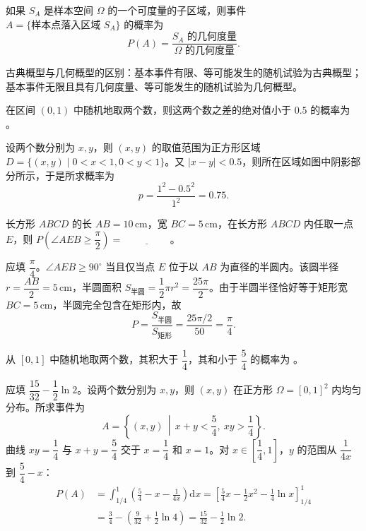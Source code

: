 \documentclass[lang=cn,11pt]{elegantbook}
\begin{document}
如果 \(S_A\) 是样本空间 \(\Omega\) 的一个可度量的子区域，则事件 \(A = \{\text{样本点落入区域 } S_A\}\) 的概率为
\[
P(A) = \frac{S_A \text{ 的几何度量}}{\Omega \text{ 的几何度量}}.
\]

\begin{note}
古典概型与几何概型的区别：基本事件有限、等可能发生的随机试验为古典概型；基本事件无限且具有几何度量、等可能发生的随机试验为几何概型。
\end{note}

\begin{exercise}\label{exer:1-7}
在区间 \((0,1)\) 中随机地取两个数，则这两个数之差的绝对值小于 \(0.5\) 的概率为 \underline{\hspace{2cm}}。
\end{exercise}

\begin{solution}
设两个数分别为 \(x, y\)，则 \((x, y)\) 的取值范围为正方形区域 \(D = \{(x, y) \mid 0 < x < 1, 0 < y < 1\}\)。又 \(|x - y| < 0.5\)，则所在区域如图中阴影部分所示，于是所求概率为
\[
p = \frac{1^2 - 0.5^2}{1^2} = 0.75.
\]
\end{solution}

\begin{exercise}\label{exer:1-24}
长方形 \(ABCD\) 的长 \(AB=10\,\mathrm{cm}\)，宽 \(BC=5\,\mathrm{cm}\)，在长方形 \(ABCD\) 内任取一点 \(E\)，则 \(P\!\left(\angle AEB \ge \dfrac{\pi}{2}\right) = \underline{\hspace{2cm}}\)。
\end{exercise}

\begin{solution}
应填 \(\dfrac{\pi}{4}\)。\(\angle AEB \ge 90^\circ\) 当且仅当点 \(E\) 位于以 \(AB\) 为直径的半圆内。该圆半径 \(r = \dfrac{AB}{2} = 5\,\mathrm{cm}\)，半圆面积 \(S_{\text{半圆}} = \dfrac{1}{2}\pi r^2 = \dfrac{25\pi}{2}\)。由于半圆半径恰好等于矩形宽 \(BC = 5\,\mathrm{cm}\)，半圆完全包含在矩形内，故
\[P = \frac{S_{\text{半圆}}}{S_{\text{矩形}}} = \frac{25\pi/2}{50} = \frac{\pi}{4}.\]
\end{solution}


\begin{exercise}\label{exer:1-37}
从 \([0,1]\) 中随机地取两个数，其积大于 \(\dfrac{1}{4}\)，其和小于 \(\dfrac{5}{4}\) 的概率为 \underline{\hspace{2cm}}。
\end{exercise}

\begin{solution}
应填 \(\dfrac{15}{32}-\dfrac{1}{2}\ln 2\)。设两个数分别为 \(x,y\)，则 \((x,y)\) 在正方形 \(\Omega=[0,1]^2\) 内均匀分布。所求事件为
\[A = \left\{(x,y)\,\middle|\, x+y<\frac{5}{4},\ xy>\frac{1}{4}\right\}.\]
曲线 \(xy=\dfrac{1}{4}\) 与 \(x+y=\dfrac{5}{4}\) 交于 \(x=\dfrac{1}{4}\) 和 \(x=1\)。对 \(x\in\left[\dfrac{1}{4},1\right]\)，\(y\) 的范围从 \(\dfrac{1}{4x}\) 到 \(\dfrac{5}{4}-x\)：
\begin{align*}
P(A) &= \int_{1/4}^{1}\left(\frac{5}{4}-x-\frac{1}{4x}\right)\mathrm{d}x = \left[\frac{5}{4}x-\frac{1}{2}x^2-\frac{1}{4}\ln x\right]_{1/4}^{1} \\
&= \frac{3}{4}-\left(\frac{9}{32}+\frac{1}{2}\ln 4\right) = \frac{15}{32}-\frac{1}{2}\ln 2.
\end{align*}
\end{solution}
\end{document}
